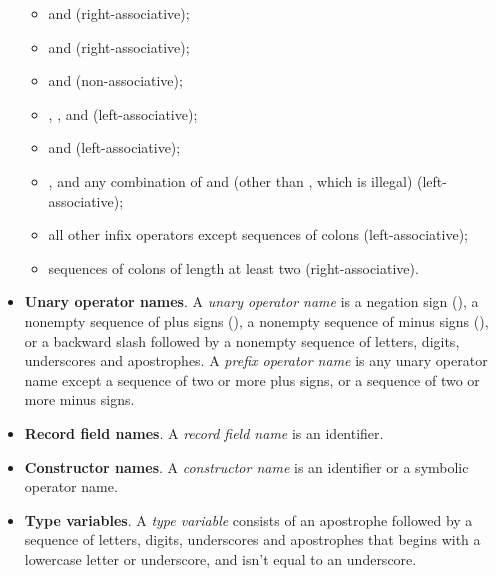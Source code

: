 \begin{itemize}
\begin{itemize}
  \item \ecnocolors{||} and \ecnocolors{\\/} (right-associative);

  \item \ecnocolors{&&} and \ecnocolors{/\\} (right-associative);

  \item \ecnocolors{=} and \ecnocolors{<>} (non-associative);

  \item \ecnocolors{<}, \ecnocolors{>}, \ecnocolors{<=} and \ecnocolors{>=}
    (left-associative);

  \item \ecnocolors{-} and \ecnocolors{+} (left-associative);

  \item \ecnocolors{*}, and any combination of \ecnocolors{/} and
    \ecnocolors{\%} (other than \ecnocolors{//}, which is illegal)
    (left-associative);

  \item all other infix operators except sequences of colons
    (left-associative);

  \item sequences of colons of length at least two (right-associative).
  \end{itemize}

\item \textbf{Unary operator names}. A \emph{unary operator name} is a
  negation sign (\ec{!}), a nonempty sequence of plus signs (\ec{+}),
  a nonempty sequence of minus signs (\ec{-}), or a backward slash
  followed by a nonempty sequence of letters, digits, underscores and
  apostrophes.  A \emph{prefix operator name} is any unary operator
  name except a sequence of two or more plus signs, or a sequence of
  two or more minus signs.

\item \textbf{Record field names}. A \emph{record field name} is an
  identifier.

\item \textbf{Constructor names}. A \emph{constructor name} is an identifier
  or a symbolic operator name.

\item \textbf{Type variables}. A \emph{type variable} consists of an
  apostrophe followed by a sequence of letters, digits, underscores
  and apostrophes that begins with a lowercase letter or underscore,
  and isn't equal to an underscore.


\end{itemize}

